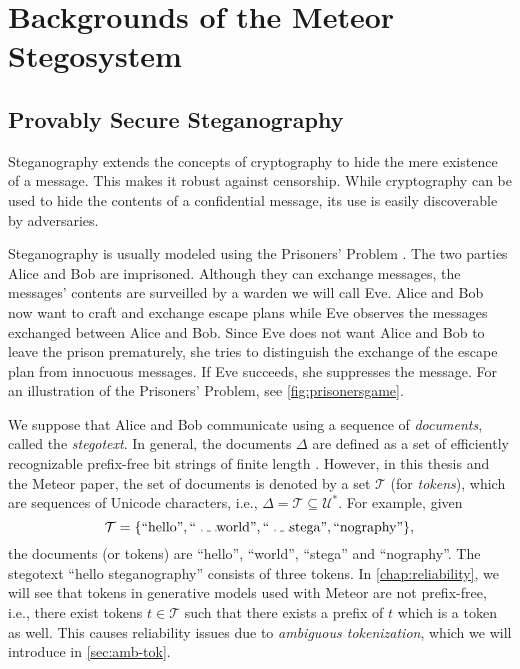 \chapter{Backgrounds of the Meteor Stegosystem}
\label{chap:previous-work}

\section{Provably Secure Steganography}
\label{sec:prov-sec-steg}

Steganography extends the concepts of cryptography to hide the mere existence of a message.
This makes it robust against censorship.
While cryptography can be used to hide the contents of a confidential message, its use is easily discoverable by adversaries.

Steganography is usually modeled using the Prisoners' Problem \cite{Simmons1983}.
The two parties Alice and Bob are imprisoned.
Although they can exchange messages, the messages' contents are surveilled by a warden we will call Eve.
Alice and Bob now want to craft and exchange escape plans while Eve observes the messages exchanged between Alice and Bob.
Since Eve does not want Alice and Bob to leave the prison prematurely, she tries to distinguish the exchange of the escape plan from innocuous messages.
If Eve succeeds, she suppresses the message.
For an illustration of the Prisoners' Problem, see \autoref{fig:prisonersgame}.

We suppose that Alice and Bob communicate using a sequence of \emph{documents}, called the \emph{stegotext}.
In general, the documents $\Delta$ are defined as a set of efficiently recognizable prefix-free bit strings of finite length \cite{Hopper2008}.
However, in this thesis and the Meteor paper, the set of documents is denoted by a set $\mathcal{T}$ (for \emph{tokens}), which are sequences of Unicode characters, i.e., $\Delta = \mathcal{T} \subseteq \mathcal{U}^*$. For example, given
$$\mathcal{T} = \{ \textrm{``hello''}, \textrm{``\Vtextvisiblespace world''}, \textrm{``\Vtextvisiblespace stega''}, \textrm{``nography''} \},$$ the documents (or tokens) are ``hello'', ``\Vtextvisiblespace world'', ``\Vtextvisiblespace stega'' and ``nography''.  
The stegotext ``hello steganography'' consists of three tokens.
In \autoref{chap:reliability}, we will see that tokens in generative models used with Meteor are not prefix-free, i.e., there exist tokens $t \in \mathcal{T}$ such that there exists a prefix of $t$ which is a token as well.
This causes reliability issues due to \emph{ambiguous tokenization}, which we will introduce in \autoref{sec:amb-tok}.

